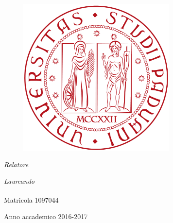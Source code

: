 
\begin{titlepage}
	\thispagestyle{empty}
	\begin{center}
		
		\vspace{4cm}
		{\scshape\LARGE \univname}\\\vspace{0.7cm} %
		\textsc{\Large \deptname}\\[0.5cm] %
		\textsc{\large \facname}
		
		\vspace{2cm}
		\begin{figure}[H]
			\begin{center}
				\includegraphics[height=8cm]{Immagini/logo}
			\end{center}
		\end{figure}
		\vspace{2cm}
		
		
		{\huge \bfseries \ttitle} %
		
		\vspace{2cm}
		
		\begin{minipage}[t]{0.49\textwidth}
			\begin{flushleft} \large
				\emph{Relatore} \\
				\supname %
			\end{flushleft}
		\end{minipage}
%
		\begin{minipage}[t]{0.49\textwidth}
			\vspace{0.5cm}
			\begin{flushright} \large
				\emph{Laureando}\\
				\authorname \\ %
				Matricola 1097044
			\end{flushright}
		\end{minipage}
	
		\vspace{1cm}
		{\large Anno accademico 2016-2017}\\[4cm] %
		
	\end{center}
\end{titlepage}